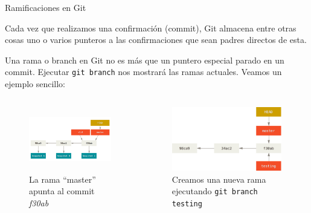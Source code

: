 \documentclass{beamer}
\begin{document}
\begin{frame}{Ramificaciones en Git}
    
    Cada vez que realizamos una confirmación (commit), Git almacena entre otras cosas uno o varios punteros a las confirmaciones que 
    sean padres directos de esta.

    Una rama o branch en Git no es más que un puntero especial parado en un commit. Ejecutar \texttt{git branch} nos mostrará las ramas actuales. Veamos un ejemplo sencillo:

    \begin{columns}
        \begin{figure}[ht]
            \begin{center}
                \includegraphics[height=1.1in]{branch-and-history.png}
            \end{center}
            \caption{La rama ``master'' apunta al commit \textit{f30ab}}
        \end{figure}
        \begin{figure}[ht]
            \begin{center}
                \includegraphics[height=1.1in]{head-to-master.png}
            \end{center}
            \caption{Creamos una nueva rama ejecutando \texttt{git branch testing}}
        \end{figure}
    \end{columns}

\end{frame}
\end{document}
